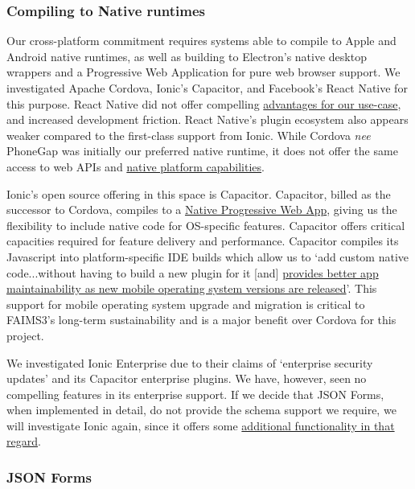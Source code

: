 \documentclass{faims3_report}
\begin{document}
\subsubsection{Compiling to Native
runtimes}

Our cross-platform commitment requires systems able to compile to Apple
and Android native runtimes, as well as building to Electron's native
desktop wrappers and a Progressive Web Application for pure web browser
support. We investigated Apache Cordova, Ionic's Capacitor, and
Facebook's React Native for this purpose. React Native did not offer
compelling
\href{https://ionicframework.com/blog/ask-a-lead-dev-react-native-or-ionic/}{{advantages
for our use-case}}, and increased development friction. React Native's
plugin ecosystem also appears weaker compared to the first-class support
from Ionic. While Cordova \emph{nee} PhoneGap was initially our
preferred native runtime, it does not offer the same access to web APIs
and
\href{https://ionicframework.com/resources/articles/capacitor-vs-cordova-modern-hybrid-app-development}{{native
platform capabilities}}.

Ionic's open source offering in this space is Capacitor. Capacitor,
billed as the successor to Cordova, compiles to a
\href{https://ionicframework.com/docs/reference/glossary}{{Native
Progressive Web App}}, giving us the flexibility to include native code
for OS-specific features. Capacitor offers critical capacities required
for feature delivery and performance. Capacitor compiles its Javascript
into platform-specific IDE builds which allow us to `add custom native
code...without having to build a new plugin for it [and]
\href{https://capacitorjs.com/docs/cordova}{{provides better app
maintainability as new mobile operating system versions are released}}'.
This support for mobile operating system upgrade and migration is
critical to FAIMS3's long-term sustainability and is a major benefit
over Cordova for this project.

We investigated Ionic Enterprise due to their claims of `enterprise
security updates' and its Capacitor enterprise plugins. We have,
however, seen no compelling features in its enterprise support. If we
decide that JSON Forms, when implemented in detail, do not provide the
schema support we require, we will investigate Ionic again, since it
offers some
\href{https://eclipsesource.com/blogs/2018/12/21/json-forms-goes-mobile-with-ionic/}{{additional
functionality in that regard}}.

\subsubsection{JSON Forms}
\end{document}

